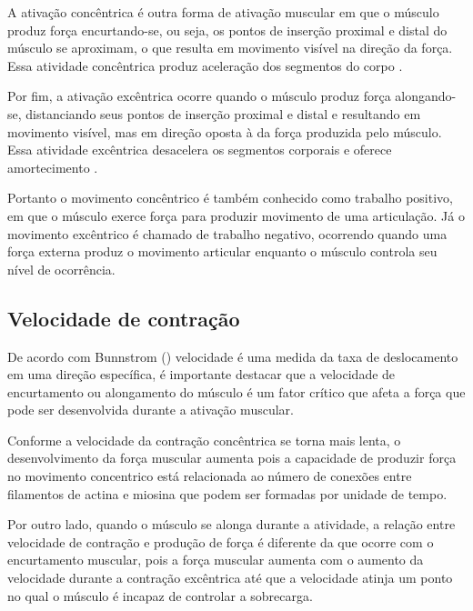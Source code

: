A ativação concêntrica é outra forma de ativação muscular em que o músculo produz força encurtando-se, ou seja, os pontos de inserção proximal e distal do músculo se aproximam, o que resulta em movimento visível na direção da força. Essa atividade concêntrica produz aceleração dos segmentos do corpo \cite{cinesiologia}.

Por fim, a ativação excêntrica ocorre quando o músculo produz força alongando-se, distanciando seus pontos de inserção proximal e distal e resultando em movimento visível, mas em direção oposta à da força produzida pelo músculo. Essa atividade excêntrica desacelera os segmentos corporais e oferece amortecimento \cite{cinesiologia}.

Portanto o movimento concêntrico é também conhecido como trabalho positivo, em que o músculo exerce força para produzir movimento de uma articulação. Já o movimento excêntrico é chamado de trabalho negativo, ocorrendo quando uma força externa produz o movimento articular enquanto o músculo controla seu nível de ocorrência.



\subsection[Velocidade de Contração]{Velocidade de contração}
De acordo com Bunnstrom (\citeyear{cinesiologia}) velocidade é uma medida da taxa de deslocamento em uma direção específica, é importante destacar que a velocidade de encurtamento ou alongamento do músculo é um fator crítico que afeta a força que pode ser desenvolvida durante a ativação muscular.

Conforme a velocidade da contração concêntrica se torna mais lenta, o desenvolvimento da força muscular aumenta pois a capacidade de produzir força no movimento concentrico está relacionada ao número de conexões entre filamentos de actina e miosina que podem ser formadas por unidade de tempo.

Por outro lado, quando o músculo se alonga durante a atividade, a relação entre velocidade de contração e produção de força é diferente da que ocorre com o encurtamento muscular, pois a força muscular aumenta com o aumento da velocidade durante a contração excêntrica até que a velocidade atinja um ponto no qual o músculo é incapaz de controlar a sobrecarga.







